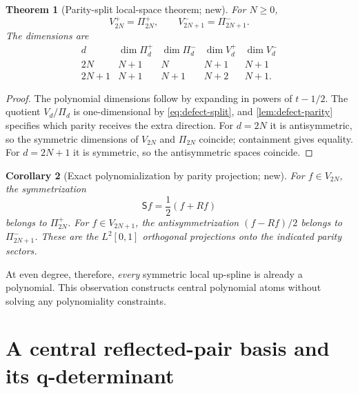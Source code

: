 \documentclass[11pt,oneside]{article}
\numberwithin{equation}{section}
\newtheorem{theorem}{Theorem}[section]
\newtheorem{corollary}[theorem]{Corollary}
\theoremstyle{definition}
\theoremstyle{remark}
\begin{document}
\begin{theorem}[Parity-split local-space theorem; new]
\label{thm:parity-split}
For $N\ge0$,
\begin{equation}
 \boxed{
 V_{2N}^{+}=\Pi_{2N}^{+},\qquad
 V_{2N+1}^{-}=\Pi_{2N+1}^{-}.}
 \label{eq:parity-exact}
\end{equation}
The dimensions are
\begin{equation}
\begin{array}{c|cccc}
 d & \dim\Pi_d^+&\dim\Pi_d^-&\dim V_d^+&\dim V_d^-\\
\hline
2N & N+1&N&N+1&N+1\\
2N+1&N+1&N+1&N+2&N+1.
\end{array}
 \label{eq:parity-dim-table}
\end{equation}
\end{theorem}

\begin{proof}
The polynomial dimensions follow by expanding in powers of $t-1/2$.  The
quotient $V_d/\Pi_d$ is one-dimensional by \eqref{eq:defect-split}, and
\cref{lem:defect-parity} specifies which parity receives the extra direction.
For $d=2N$ it is antisymmetric, so the symmetric dimensions of $V_{2N}$ and
$\Pi_{2N}$ coincide; containment gives equality.  For $d=2N+1$ it is
symmetric, so the antisymmetric spaces coincide.
\end{proof}

\begin{corollary}[Exact polynomialization by parity projection; new]
\label{cor:parity-projection}
For $f\in V_{2N}$, the symmetrization
\begin{equation}
 \mathsf Sf=\frac12(f+Rf)
 \label{eq:symmetrizer}
\end{equation}
belongs to $\Pi_{2N}^+$.  For $f\in V_{2N+1}$, the antisymmetrization
$(f-Rf)/2$ belongs to $\Pi_{2N+1}^-$.  These are the $L^2[0,1]$ orthogonal
projections onto the indicated parity sectors.
\end{corollary}

At even degree, therefore, \emph{every} symmetric local up-spline is already a
polynomial.  This observation constructs central polynomial atoms without
solving any polynomiality constraints.

\section{A central reflected-pair basis and its q-determinant}
\label{sec:central}
\end{document}
